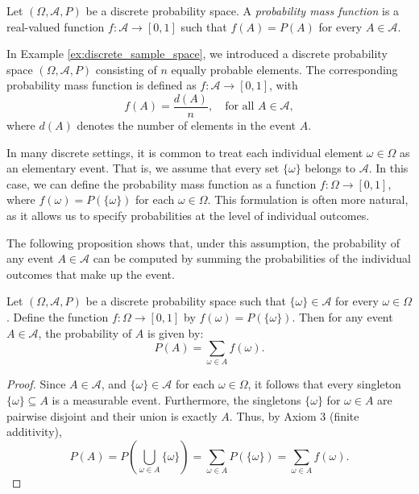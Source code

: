 \begin{definition}
\label{def:probability_function}
Let $\left( \Omega, \mathcal{A}, P \right)$ be a discrete probability space. A \emph{probability mass function} is a real-valued function $f : \mathcal{A} \rightarrow [0, 1]$ such that $f(A) = P(A)$ for every $A \in \mathcal{A}$.
\end{definition}

In Example \ref{ex:discrete_sample_space}, we introduced a discrete probability space $\left( \Omega, \mathcal{A}, P \right)$ consisting of $n$ equally probable elements. The corresponding probability mass function is defined as $f : \mathcal{A} \rightarrow [0, 1]$, with
\[
f(A) = \frac{d(A)}{n}, \quad \text{for all } A \in \mathcal{A},
\]
where $d(A)$ denotes the number of elements in the event $A$.

In many discrete settings, it is common to treat each individual element $\omega \in \Omega$ as an elementary event. That is, we assume that every set $\{\omega\}$ belongs to $\mathcal{A}$. In this case, we can define the probability mass function as a function $f : \Omega \rightarrow [0,1]$, where $f(\omega) = P(\{\omega\})$ for each $\omega \in \Omega$. This formulation is often more natural, as it allows us to specify probabilities at the level of individual outcomes.

The following proposition shows that, under this assumption, the probability of any event $A \in \mathcal{A}$ can be computed by summing the probabilities of the individual outcomes that make up the event.

\begin{proposition}
Let $\left( \Omega, \mathcal{A}, P \right)$ be a discrete probability space such that $\{\omega\} \in \mathcal{A}$ for every $\omega \in \Omega$. Define the function $f : \Omega \rightarrow [0,1]$ by $f(\omega) = P(\{\omega\})$. Then for any event $A \in \mathcal{A}$, the probability of $A$ is given by:
\[
P(A) = \sum_{\omega \in A} f(\omega).
\]
\end{proposition}
\begin{proof}
Since $A \in \mathcal{A}$, and $\{\omega\} \in \mathcal{A}$ for each $\omega \in \Omega$, it follows that every singleton $\{\omega\} \subseteq A$ is a measurable event. Furthermore, the singletons $\{ \omega \}$ for $\omega \in A$ are pairwise disjoint and their union is exactly $A$. Thus, by Axiom 3 (finite additivity),
\[
P(A) = P\left( \bigcup_{\omega \in A} \{\omega\} \right) = \sum_{\omega \in A} P(\{\omega\}) = \sum_{\omega \in A} f(\omega).
\]
\end{proof}


